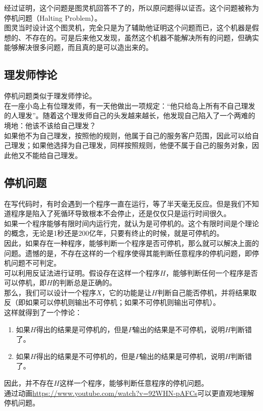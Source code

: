 经过证明，这个问题是图灵机回答不了的，所以原问题得以证否。这个问题被称为停机问题（Halting Problem）。\\

图灵当时设计这个图灵机，完全只是为了辅助他证明这个问题而已，这个机器是假想的、不存在的。可是后来他又发现，虽然这个机器不能解决所有的问题，但确实能够解决很多问题，而且真的是可以造出来的。\\

\subsection{理发师悖论}

停机问题类似于理发师悖论。\\

在一座小岛上有位理发师，有一天他做出一项规定：“他只给岛上所有不自己理发的人理发”。随着这个理发师自己的头发越来越长，他发现自己陷入了一个两难的境地：他该不该给自己理发？\\

如果他不为自己理发，按照他的规则，他属于自己的服务客户范围，因此可以给自己理发；如果他选择为自己理发，同样按照规则，他便不属于自己的服务对象，因此他又不能给自己理发。\\

\subsection{停机问题}

在写代码时，有时会遇到一个程序一直在运行，等了半天毫无反应。但是我们不知道程序是陷入了死循环导致根本不会停止，还是仅仅只是运行时间很久。\\

如果一个程序能够有限时间内运行完，就认为是可停机的。这个有限时间是个理论的概念，无论是1秒还是200亿年，只要有终止的时候，就是可停机的。\\

因此，如果存在一种程序，能够判断一个程序是否可停机，那么就可以解决上面的问题。遗憾的是，不存在这样的一个程序使得其能判断任意程序的停机问题，即停机问题不可判定。\\

可以利用反证法进行证明。假设存在这样一个程序$ H $，能够判断任何一个程序是否可以停机，即$ H $的判断总是正确的。\\

那么，我们可以设计一个程序$ X $，它的功能是让$ H $判断自己能否停机，并将结果取反（即如果可以停机则输出不可停机；如果不可停机则输出可停机）。\\

这样就得到了一个悖论：

\begin{enumerate}
    \item 如果$ H $得出的结果是可停机的，但是$ P $输出的结果是不可停机，说明$ H $判断错了。
    \item 如果$ H $得出的结果是不可停机的，但是$ P $输出的结果是可停机，说明$ H $判断错了。
\end{enumerate}

因此，并不存在$ H $这样一个程序，能够判断任意程序的停机问题。\\

通过动画\url{https://www.youtube.com/watch?v=92WHN-pAFCs}可以更直观地理解停机问题。

\newpage